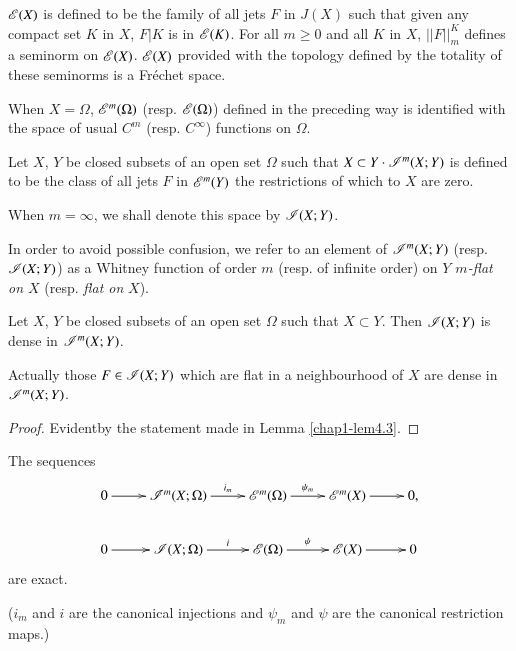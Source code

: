 $\mathscr{E}(X)$ is defined to be the family of all jets $F$ in $J(X)$ such that given any compact set $K$ in $X$, $F|K$ is in $\mathscr{E}(K)$. For all $m\geq 0$ and all $K$ in $X$, $||F||^{K}_{m}$ defines a seminorm on $\mathscr{E}(X)$. $\mathscr{E}(X)$ provided with the topology defined by the totality of these seminorms is a Fr\'echet space.

When $X=\Omega$, $\mathscr{E}^{m}(\Omega)$ (resp. $\mathscr{E}(\Omega)$) defined in the preceding way is identified with the space of usual $C^{m}$ (resp. $C^{\infty}$) functions on $\Omega$.

\begin{definition}\label{chap1-defi5.1}
Let $X$, $Y$ be closed subsets of an open set $\Omega$ such that $X\subset Y\cdot \mathscr{I}^{m}(X;Y)$ is defined to be the class of all jets $F$ in $\mathscr{E}^{m}(Y)$ the restrictions of which to $X$ are zero.

When $m=\infty$, we shall denote this space by $\mathscr{I}(X;Y)$.
\end{definition}

In order to avoid possible confusion, we refer to an element of $\mathscr{I}^{m}(X;Y)$ (resp. $\mathscr{I}(X;Y)$) as a Whitney function of order $m$ (resp. of infinite order) on {\em $Y$ $m$-flat on $X$} (resp. {\em flat on} $X$).

\begin{proposition}\label{chap1-prop5.2}
Let $X$, $Y$ be closed subsets of an open set $\Omega$ such that $X\subset Y$. Then $\mathscr{I}(X;Y)$ is dense in $\mathscr{I}^{m}(X;Y)$.
\end{proposition}

Actually those $F\in \mathscr{I}(X;Y)$ which are flat in a neighbourhood of $X$ are dense in $\mathscr{I}^{m}(X;Y)$.

\begin{proof}
Evident\pageoriginale by the statement made in Lemma \ref{chap1-lem4.3}.
\end{proof}

\begin{proposition}\label{chap1-prop5.3}
The sequences
\[
\xymatrix{
0\ar[r] & \scrI^{m}(X;\Omega)\ar[r]^-{i_{m}} & \scrE^{m}(\Omega)\ar[r]^-{\psi_{m}} & \scrE^{m}(X)\ar[r] & 0,\\
0\ar[r] & \scrI(X;\Omega)\ar[r]^-{i} & \scrE(\Omega)\ar[r]^-{\psi} & \scrE(X)\ar[r] & 0
}
\]
are exact.
\end{proposition}

($i_{m}$ and $i$ are the canonical injections and $\psi_{m}$ and $\psi$ are the canonical restriction maps.)

